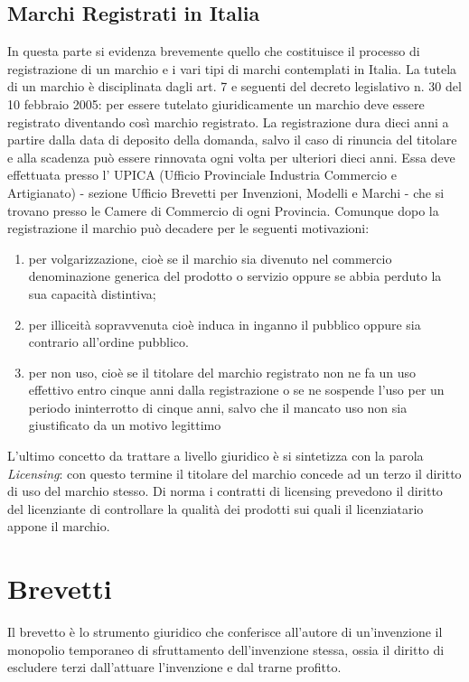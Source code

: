 \subsection{Marchi Registrati in Italia}
In questa parte si evidenza brevemente quello che costituisce il processo di registrazione di un marchio e i vari tipi di marchi contemplati in Italia.
La tutela di un marchio è disciplinata dagli art. 7 e seguenti del decreto legislativo n. 30 del 10 febbraio 2005: per essere tutelato giuridicamente un marchio deve essere registrato diventando così marchio registrato. La registrazione dura dieci anni a partire dalla data di deposito della domanda, salvo il caso di rinuncia del titolare e alla scadenza può essere rinnovata ogni volta per ulteriori dieci anni.
Essa deve effettuata presso l' UPICA (Ufficio Provinciale Industria Commercio e Artigianato) - sezione Ufficio Brevetti per Invenzioni, Modelli e Marchi - che si trovano presso le Camere di Commercio di ogni Provincia.
Comunque dopo la registrazione il marchio può decadere per le seguenti motivazioni:

\begin{enumerate}
\item  per volgarizzazione, cioè se il marchio sia divenuto nel commercio denominazione generica del prodotto o servizio oppure se abbia perduto la sua capacità distintiva;
\item per illiceità sopravvenuta cioè induca in inganno il pubblico  oppure sia contrario all'ordine pubblico.
\item per non uso, cioè se il titolare del marchio registrato non ne fa un uso effettivo entro cinque anni dalla registrazione o se ne sospende l'uso per un periodo ininterrotto di cinque anni, salvo che il mancato uso non sia giustificato da un motivo legittimo
\end{enumerate}

L'ultimo concetto da trattare a livello giuridico è si sintetizza con la parola  \textit{Licensing}: con questo termine il titolare del marchio concede ad un terzo il diritto di uso del marchio stesso. Di norma i contratti di licensing prevedono il diritto del licenziante di controllare la qualità dei prodotti sui quali il licenziatario appone il marchio.



\section{Brevetti} \label{sec:brevetti}
Il brevetto è lo strumento giuridico che conferisce all'autore di un'invenzione il monopolio temporaneo di sfruttamento dell'invenzione stessa, ossia il diritto di escludere terzi dall'attuare l'invenzione e dal trarne profitto. 


